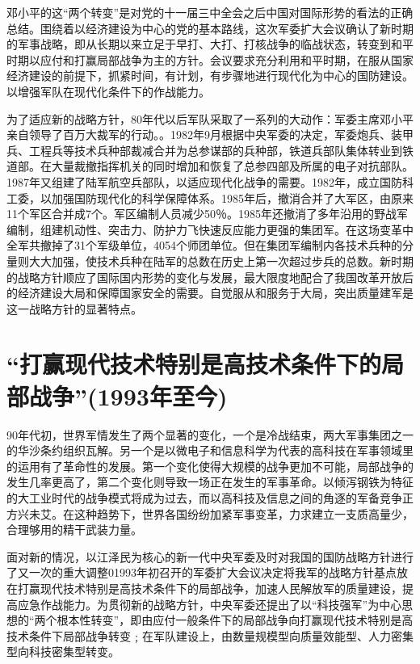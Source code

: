\documentclass[UTF8, 12pt, a4paper]{ctexrep}
\begin{document}
邓小平的这“两个转变”是对党的十一届三中全会之后中国对国际形势的看法的正确总结。围绕着以经济建设为中心的党的基本路线，这次军委扩大会议确认了新时期的军事战略，即从长期以来立足于早打、大打、打核战争的临战状态，转变到和平时期以应付和打赢局部战争为主的方针。会议要求充分利用和平时期，在服从国家经济建设的前提下，抓紧时间，有计划，有步骤地进行现代化为中心的国防建设。以增强军队在现代化条件下的作战能力。

为了适应新的战略方针，80年代以后军队采取了一系列的大动作：军委主席邓小平亲自领导了百万大裁军的行动。。1982年9月根据中央军委的决定，军委炮兵、装甲兵、工程兵等技术兵种部裁减合并为总参谋部的兵种部，铁道兵部队集体转业到铁道部。在大量裁撤指挥机关的同时增加和恢复了总参四部及所属的电子对抗部队。1987年又组建了陆军航空兵部队，以适应现代化战争的需要。1982年，成立国防科工委，以加强国防现代化的科学保障体系。1985年后，撤消合并了大军区，由原来11个军区合并成7个。军区编制人员减少50％。1985年还撤消了多年沿用的野战军编制，组建机动性、突击力、防护力飞快速反应能力更强的集团军。在这场变革中全军共撤掉了31个军级单位，4054个师团单位。但在集团军编制内各技术兵种的分量则大大加强，使技术兵种在陆军的总数在历史上第一次超过步兵的总数。新时期的战略方针顺应了国际国内形势的变化与发展，最大限度地配合了我国改革开放后的经济建设大局和保障国家安全的需要。自觉服从和服务于大局，突出质量建军是这一战略方针的显著特点。

\section{“打赢现代技术特别是高技术条件下的局部战争”(1993年至今)}

90年代初，世界军情发生了两个显著的变化，一个是冷战结束，两大军事集团之一的华沙条约组织瓦解。另一个是以微电子和信息科学为代表的高科技在军事领域里的运用有了革命性的发展。第一个变化使得大规模的战争更加不可能，局部战争的发生几率更高了，第二个变化则导致一场正在发生的军事革命。以倾泻钢铁为特征的大工业时代的战争模式将成为过去，而以高科技及信息之间的角逐的军备竞争正方兴未艾。在这种趋势下，世界各国纷纷加紧军事变革，力求建立一支质高量少，合理够用的精干武装力量。

面对新的情况，以江泽民为核心的新一代中央军委及时对我国的国防战略方针进行了又一次的重大调整01993年初召开的军委扩大会议决定将我军的战略方针基点放在打赢现代技术特别是高技术条件下的局部战争，加速人民解放军的质量建设，提高应急作战能力。为贯彻新的战略方针，中央军委还提出了以“科技强军”为中心思想的“两个根本性转变”，即由应付一般条件下的局部战争向打赢现代技术特别是高技术条件下局部战争转变﹔在军队建设上，由数量规模型向质量效能型、人力密集型向科技密集型转变。
\end{document}
